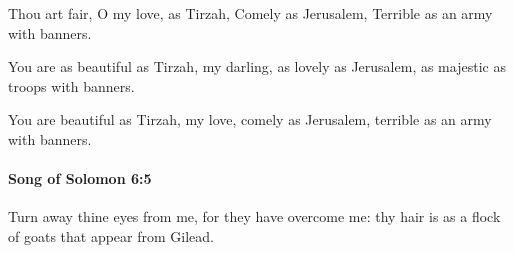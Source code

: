 			\begin{versebox}
					\item[BHS] 
					\item[LXX] 
					\item[ASV] Thou art fair, O my love, as Tirzah, Comely as Jerusalem, Terrible as an army with banners.
					\item[NIV] You are as beautiful as Tirzah, my darling, as lovely as Jerusalem, as majestic as troops with banners.
					\item[NRSV] You are beautiful as Tirzah, my love, comely as Jerusalem, terrible as an army with banners.
			\end{versebox}

		\paragraph{Song of Solomon 6:5} %
			\label{SONGOFSOLOMON-6-5}

			Turn away thine eyes from me, for they have overcome me: thy hair is as a flock of goats that appear from Gilead.

